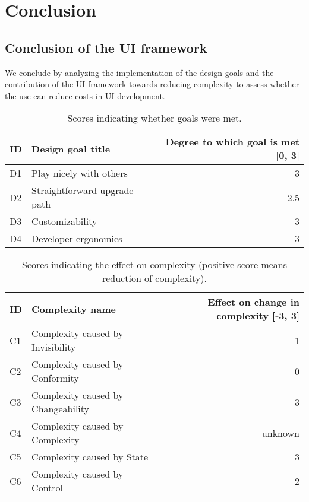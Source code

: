 \section{Conclusion}\label{conclusion}

\subsection{Conclusion of the UI framework}
We conclude by analyzing the implementation of the design goals and the contribution of the UI framework towards reducing complexity to assess whether the use can reduce costs in UI development.

\begin{table}[!htb]
  \begin{center}
    \begin{tabular}{|l|l|r|}
      \hline
      \textbf{ID} & \textbf{Design goal title} & \textbf{Degree to which goal is met [0, 3]} \\
      \hline
      D1 & Play nicely with others & 3 \\
      \hline
      D2 & Straightforward upgrade path & 2.5 \\
      \hline
      D3 & Customizability & 3 \\
      \hline
      D4 & Developer ergonomics & 3 \\
      \hline
    \end{tabular}
    \caption{Scores indicating whether goals were met.}
  \end{center}
\end{table}

\begin{table}[!htb]
  \begin{center}
    \begin{tabular}{|l|l|r|}
      \hline
      \textbf{ID} & \textbf{Complexity name} & \textbf{Effect on change in complexity [-3, 3]} \\
      \hline
      C1 & Complexity caused by Invisibility & 1 \\
      \hline
      C2 & Complexity caused by Conformity & 0 \\
      \hline
      C3 & Complexity caused by Changeability & 3 \\
      \hline
      C4 & Complexity caused by Complexity & unknown \\
      \hline
      C5 & Complexity caused by State & 3 \\
      \hline
      C6 & Complexity caused by Control & 2 \\
      \hline
    \end{tabular}
    \caption{Scores indicating the effect on complexity (positive score means reduction of complexity).}
    \label{tab:summarycomplexity}
  \end{center}
\end{table}

